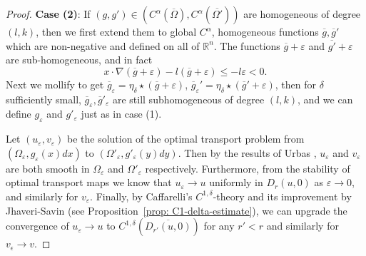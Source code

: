 \documentclass[12pt,reqno]{amsart}
\newcommand{\eps}{\varepsilon}
\numberwithin{equation}{section}
\begin{document}
\begin{proof}
{\bf Case (2)}: If $(g, g')\in(C^{\alpha}(\overline{\Omega}),C^{\alpha}(\overline{\Omega'}))$ are homogeneous of degree $(l, k)$, then we first extend them to global $C^{\alpha}$,  homogeneous functions $\overline g, \overline{g}'$ which are non-negative and defined on all of $\mathbb R^n$. The functions $\overline g+\eps$ and $\overline{g'}+\eps$ are sub-homogeneous, and in fact
        \[x\cdot \nabla(\overline g+\eps)- l(\overline g+\eps)\leq -l\eps<0. \]
        Next we mollify to get $\overline g_{\eps} = \eta_{\delta}\star(\overline g+\eps)$, $\overline g_{\eps}' = \eta_{\delta}\star(\overline g'+\eps)$, then for $\delta$ sufficiently small, $\overline g_{\eps}, \overline g'_{\eps}$ are still subhomogeneous of degree $(l, k)$, and we can define $g_{\eps}$ and $g'_{\eps}$ just as in case (1). 

\bigskip
Let $(u_{\eps}, v_{\eps})$ be the solution of the optimal transport problem from $(\Omega_{\eps}, g_{\eps}(x)dx)$ to $(\Omega'_{\eps}, g'_{\eps}(y)dy)$.  Then by the results of Urbas \cite{Urbas}, $u_{\eps}$ and $v_{\eps}$ are both smooth in $\Omega_{\eps}$ and $\Omega'_{\eps}$ respectively. Furthermore, from the stability of optimal transport maps we know that $u_{\eps}\to u$ uniformly in $D_r(u, 0)$ as $\eps\to 0$, and similarly for $v_{\eps}$. Finally, by Caffarelli's $C^{1, \delta}$-theory and its improvement by Jhaveri-Savin (see Proposition~\ref{prop: C1-delta-estimate}), we can upgrade the convergence of $u_{\eps}\to u$ to $C^{1, \delta}(\overline{D_{r'}(u, 0)})$ for any $r'<r$ and similarly for $v_{\epsilon} \rightarrow v$.
\end{proof}
\end{document}
